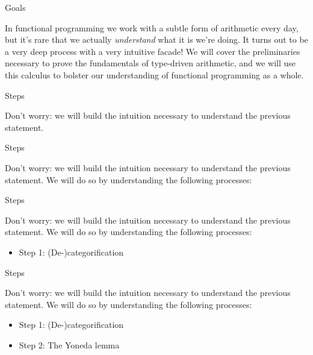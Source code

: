 \documentclass[tikz]{beamer}
\theoremstyle{definition}
\begin{document}
\begin{frame}{Goals}
    
    In functional programming we work with a subtle form of arithmetic every day, but it's rare that we actually \textit{understand} what it is we're doing. It turns out to be a very deep process with a very intuitive facade! We will cover the preliminaries necessary to prove the fundamentals of type-driven arithmetic, and we will use this calculus to bolster our understanding of functional programming as a whole.
    
\end{frame}

\begin{frame}{Steps}
    
    Don't worry: we will build the intuition necessary to understand the 
    previous statement. 
    
\end{frame}

\begin{frame}{Steps}
    
    Don't worry: we will build the intuition necessary to understand the 
    previous statement. We will do so by understanding the following processes:

    
\end{frame}

\begin{frame}{Steps}
    
    Don't worry: we will build the intuition necessary to understand the 
    previous statement. We will do so by understanding the following processes:
    
\begin{itemize}
    \item Step 1: (De-)categorification
\end{itemize}
    
\end{frame}

\begin{frame}{Steps}
    
    Don't worry: we will build the intuition necessary to understand the 
    previous statement. We will do so by understanding the following processes:
    
\begin{itemize}
    \item Step 1: (De-)categorification
    \item Step 2: The Yoneda lemma
\end{itemize}
\end{frame}
\end{document}
